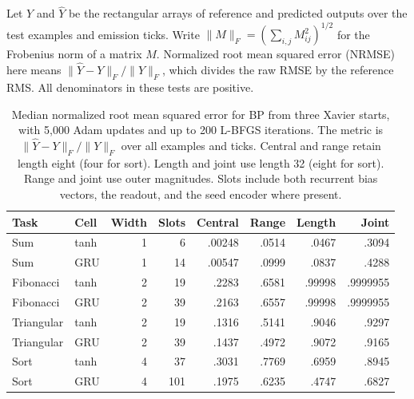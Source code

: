 Let \(Y\) and \(\hat Y\) be the rectangular arrays of reference and predicted outputs over the test examples and emission ticks. Write \(\|M\|_F=(\sum_{i,j}M_{ij}^2)^{1/2}\) for the Frobenius norm of a matrix \(M\). Normalized root mean squared error (NRMSE) here means \(\|\hat Y-Y\|_F/\|Y\|_F\), which divides the raw RMSE by the reference RMS. All denominators in these tests are positive.

\begin{table}[htbp]
\centering\small
\caption{Median normalized root mean squared error for BP from three Xavier starts, with 5,000 Adam updates and up to 200 L-BFGS iterations. The metric is \(\|\hat Y-Y\|_F/\|Y\|_F\) over all examples and ticks. Central and range retain length eight (four for sort). Length and joint use length 32 (eight for sort). Range and joint use outer magnitudes. Slots include both recurrent bias vectors, the readout, and the seed encoder where present.}
\label{tab:passive-rnn}
\begin{tabular}{@{}llrrrrrr@{}}\toprule
Task & Cell & Width & Slots & Central & Range & Length & Joint\\\midrule
Sum & tanh & 1 & 6 & .00248 & .0514 & .0467 & .3094\\
Sum & GRU & 1 & 14 & .00547 & .0999 & .0837 & .4288\\
Fibonacci & tanh & 2 & 19 & .2283 & .6581 & .99998 & .9999955\\
Fibonacci & GRU & 2 & 39 & .2163 & .6557 & .99998 & .9999955\\
Triangular & tanh & 2 & 19 & .1316 & .5141 & .9046 & .9297\\
Triangular & GRU & 2 & 39 & .1437 & .4972 & .9072 & .9165\\
Sort & tanh & 4 & 37 & .3031 & .7769 & .6959 & .8945\\
Sort & GRU & 4 & 101 & .1975 & .6235 & .4747 & .6827\\
\bottomrule\end{tabular}
\end{table}

